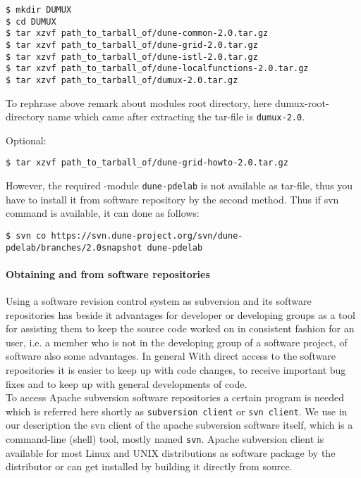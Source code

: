 \begin{lstlisting}[style=Bash]
$ mkdir DUMUX
$ cd DUMUX
$ tar xzvf path_to_tarball_of/dune-common-2.0.tar.gz 
$ tar xzvf path_to_tarball_of/dune-grid-2.0.tar.gz 
$ tar xzvf path_to_tarball_of/dune-istl-2.0.tar.gz 
$ tar xzvf path_to_tarball_of/dune-localfunctions-2.0.tar.gz 
$ tar xzvf path_to_tarball_of/dumux-2.0.tar.gz
\end{lstlisting}

To rephrase above remark about modules root directory, here dumux-root-directory name which came after extracting the tar-file is \texttt{dumux-2.0}.

Optional:
\begin{lstlisting}[style=Bash]
$ tar xzvf path_to_tarball_of/dune-grid-howto-2.0.tar.gz
\end{lstlisting}

However, the required \Dune-module \texttt{dune-pdelab} is not available as tar-file, thus you have to install it from software repository by the second method.  Thus if svn command is available, it can done as follows: 
\begin{lstlisting}[style=Bash]
$ svn co https://svn.dune-project.org/svn/dune-pdelab/branches/2.0snapshot dune-pdelab
\end{lstlisting}

\paragraph{Obtaining \Dune and \Dumux from software repositories} 

Using a software revision control system as subversion and its software repositories has beside it advantages for developer or developing groups as a tool for assisting them to keep the source code worked on in consistent fashion for an user, i.e. a member who is not in the developing group of a software project, of software also some advantages.
In general With direct access to the software repositories it is easier to keep up with code changes, to receive important bug fixes and to keep up with general developments of code.\\

To access Apache subversion software repositories a certain program is needed which is referred here shortly as \texttt{subversion client} or \texttt{svn client}. We use in our description the svn client of the apache subversion software itself, which is a command-line (shell) tool, mostly named \texttt{svn}. 
Apache subversion client is available for most Linux and UNIX distributions as software package by the distributor or can get installed by building it directly from source.\\

